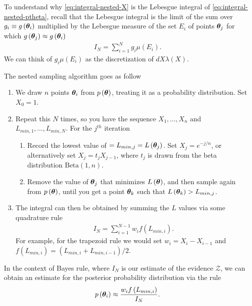 To understand why \eqref{eq:integral-nested-X} is the Lebesgue integral of \eqref{eq:integral-nested-ptheta}, recall that the Lebesgue integral is the limit of the sum over $g_i\equiv g\left({\bm \theta}_i\right)$ multiplied by the Lebesgue measure of the set $E_i$ of points ${\bm \theta}_j$ for which $g\left({\bm \theta}_j\right)\approx g\left({\bm \theta}_i\right)$
\begin{align}
    \label{eq:lebesgue-sum}
    I_N
    =
    \sum_{i=1}^N g_i \mu\left(E_i\right)
    .
\end{align}
We can think of $g_i \mu\left(E_i\right)$ as the discretization of $dX \lambda\left(X\right)$.

The nested sampling algorithm goes as follow
\begin{enumerate}
    \item We draw $n$ points ${\bm \theta}_i$ from $p\left({\bm \theta}\right)$, treating it as a probability distribution. 
        Set $X_0=1$.
    \item Repeat this $N$ times, so you have the sequence $X_1,...,X_n$ and $L_{min,1},...,L_{min,N}$. For the $j^{th}$ iteration
    \begin{enumerate}
        \item Record the lowest value of $=L_{min,j}=L\left({\bm \theta}_j\right)$. 
            Set $X_j = e^{-j/n}$, or alternatively set $X_j = t_j X_{j-1}$, where
            $t_j$ is drawn from the beta distribution $\mathrm{Beta}\left(1,n\right)$.
        \item Remove the value of ${\bm \theta}_j$ that minimizes $L\left({\bm \theta}\right)$,
            and then sample again from $p\left({\bm \theta}\right)$, until you get a point
            ${\bm \theta}_k$ such that $L\left({\bm \theta}_k\right)>L_{min,j}$.
    \end{enumerate}
    \item The integral can then be obtained by summing the $L$ values via some quadrature rule 
        \begin{align}
            I_N
            =
            \sum_{i=1}^{N-1} w_i f\left(L_{min,i}\right)
            .
        \end{align}
        For example, for the trapezoid rule we would set $w_i = X_{i}-X_{i-1}$ and $f\left(L_{min,i}\right)=\left(L_{min,i} + L_{min,i-1}\right)/2$.  
\end{enumerate}
In the context of Bayes rule, where $I_N$ is our estimate of the evidence $\mathcal{Z}$, we can obtain an estimate for the posterior probability distribution via the rule
\begin{align}
    p\left({\bm \theta}_i\right)
    \approx
    \frac{w_i f\left(L_{min,i}\right)}{I_N}
    .
\end{align}

